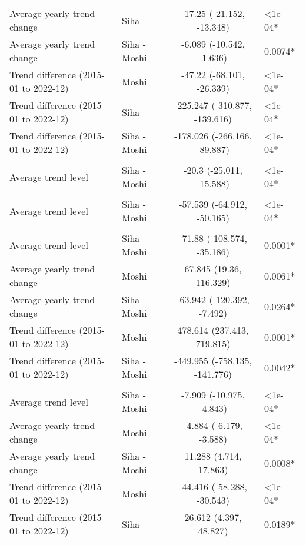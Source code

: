 \begin{longtable}{l|lcl}
Average yearly trend change & Siha & -17.25 (-21.152, -13.348) & <1e-04* \\ 
Average yearly trend change & Siha - Moshi & -6.089 (-10.542, -1.636) & 0.0074* \\ 
Trend difference (2015-01 to 2022-12) & Moshi & -47.22 (-68.101, -26.339) & <1e-04* \\ 
Trend difference (2015-01 to 2022-12) & Siha & -225.247 (-310.877, -139.616) & <1e-04* \\ 
Trend difference (2015-01 to 2022-12) & Siha - Moshi & -178.026 (-266.166, -89.887) & <1e-04* \\ 
\midrule\addlinespace[2.5pt]
\multicolumn{4}{l}{Neuroses} \\[2.5pt] 
\midrule\addlinespace[2.5pt]
Average trend level & Siha - Moshi & -20.3 (-25.011, -15.588) & <1e-04* \\ 
\midrule\addlinespace[2.5pt]
\multicolumn{4}{l}{Other Cardiovascular Diseases} \\[2.5pt] 
\midrule\addlinespace[2.5pt]
Average trend level & Siha - Moshi & -57.539 (-64.912, -50.165) & <1e-04* \\ 
\midrule\addlinespace[2.5pt]
\multicolumn{4}{l}{Pneumonia, Severe} \\[2.5pt] 
\midrule\addlinespace[2.5pt]
Average trend level & Siha - Moshi & -71.88 (-108.574, -35.186) & 0.0001* \\ 
Average yearly trend change & Moshi & 67.845 (19.36, 116.329) & 0.0061* \\ 
Average yearly trend change & Siha - Moshi & -63.942 (-120.392, -7.492) & 0.0264* \\ 
Trend difference (2015-01 to 2022-12) & Moshi & 478.614 (237.413, 719.815) & 0.0001* \\ 
Trend difference (2015-01 to 2022-12) & Siha - Moshi & -449.955 (-758.135, -141.776) & 0.0042* \\ 
\midrule\addlinespace[2.5pt]
\multicolumn{4}{l}{Poisoning} \\[2.5pt] 
\midrule\addlinespace[2.5pt]
Average trend level & Siha - Moshi & -7.909 (-10.975, -4.843) & <1e-04* \\ 
Average yearly trend change & Moshi & -4.884 (-6.179, -3.588) & <1e-04* \\ 
Average yearly trend change & Siha - Moshi & 11.288 (4.714, 17.863) & 0.0008* \\ 
Trend difference (2015-01 to 2022-12) & Moshi & -44.416 (-58.288, -30.543) & <1e-04* \\ 
Trend difference (2015-01 to 2022-12) & Siha & 26.612 (4.397, 48.827) & 0.0189* \\ 

\end{longtable}
